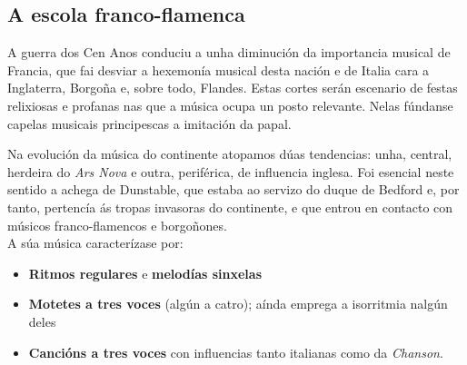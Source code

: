 \subsection*{A escola franco-flamenca}

\begin{multicols}{2}

A guerra dos Cen Anos conduciu a unha diminución da importancia musical de Francia, que fai desviar a hexemonía musical desta nación e de Italia cara a Inglaterra, Borgoña e, sobre todo, Flandes. Estas cortes serán escenario de festas relixiosas e profanas nas que a música ocupa un
posto relevante. Nelas fúndanse capelas musicais principescas a imitación da papal.
\par
Na evolución da música do continente atopamos dúas tendencias: unha, central, herdeira do \emph{Ars Nova} e outra, periférica, de influencia inglesa. Foi esencial neste sentido a achega de Dunstable, que estaba ao servizo do duque de Bedford e, por tanto, pertencía ás tropas invasoras do continente, e que entrou en contacto con músicos franco-flamencos e borgoñones.\\
A súa música caracterízase por:
%
\begin{itemize}
\item
  \textbf{Ritmos regulares} e \textbf{melodías sinxelas}
\item
  \textbf{Motetes a tres voces} (algún a catro); aínda emprega a isorritmia nalgún deles
\item
  \textbf{Cancións a tres voces} con influencias tanto italianas como da \emph{Chanson}.
\end{itemize}
\end{multicols}
%
